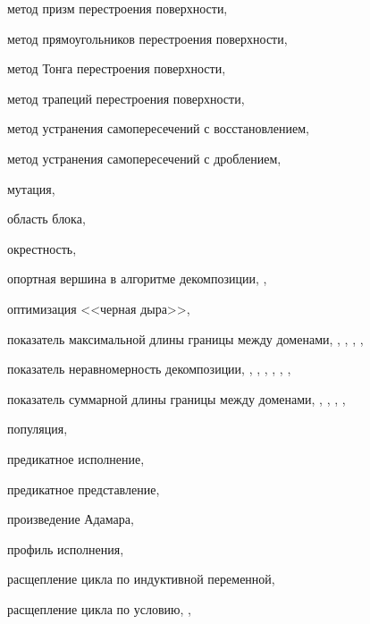 метод призм перестроения поверхности, \pageref{term:method_remesh_prism}

метод прямоугольников перестроения поверхности, \pageref{term:method_remesh_rect}

метод Тонга перестроения поверхности, \pageref{term:method_remesh_tong}

метод трапеций перестроения поверхности, \pageref{term:method_remesh_trap}

метод устранения самопересечений с восстановлением, \pageref{term:method_selfint_repare}

метод устранения самопересечений с дроблением, \pageref{term:method_selfint_cut}

мутация, \pageref{term:mutation}

область блока, \pageref{term:block_scope}

окрестность, \pageref{term:okrestnost}

опортная вершина в алгоритме декомпозиции, \pageref{term:opor_point}, \pageref{term:opor_point2}

оптимизация <<черная дыра>>, \pageref{term:blackhome_optimization}

показатель максимальной длины границы между доменами, \pageref{term:decomp_maxbord}, \pageref{term:decomp_maxbord2}, \pageref{term:decomp_maxbord3}, \pageref{term:decomp_maxbord4}, \pageref{term:decomp_maxbord5}

показатель неравномерность декомпозиции, \pageref{term:decomp_neravn}, \pageref{term:decomp_neravn2}, \pageref{term:decomp_neravn3}, \pageref{term:decomp_neravn4}, \pageref{term:decomp_neravn5}, \pageref{term:decomp_neravn6}, \pageref{term:decomp_neravn7}

показатель суммарной длины границы между доменами, \pageref{term:decomp_sumbord}, \pageref{term:decomp_sumbord2}, \pageref{term:decomp_sumbord3}, \pageref{term:decomp_sumbord4}, \pageref{term:decomp_sumbord5}

популяция, \pageref{term:population}

предикатное исполнение, \pageref{term:predicate_execution}

предикатное представление, \pageref{term:predicate_view}

произведение Адамара, \pageref{term:hadamar_mul}

профиль исполнения, \pageref{term:execution_profile}

расщепление цикла по индуктивной переменной, \pageref{term:loop_split_by_inductive}

расщепление цикла по условию, \pageref{term:loop_split_by_cond}, \pageref{term:loop_split_by_cond2}

